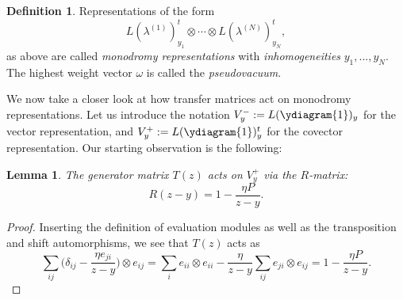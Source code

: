 \documentclass[11pt]{report}
\newtheorem{lemma}[theorem]{Lemma}
\theoremstyle{definition}
\newtheorem{definition}[theorem]{Definition}
\theoremstyle{remark}
\theoremstyle{remark}
\begin{document}
\begin{definition}
Representations of the form
\begin{equation*}
L(\lambda^{(1)})_{y_1}^t \otimes \cdots \otimes L(\lambda^{(N)})_{y_N}^t,
\end{equation*}
as above are called \emph{monodromy representations} with \emph{inhomogeneities} $y_1,...,y_N$. The highest weight vector $\omega$ is called the \emph{pseudovacuum}.
\end{definition}

We now take a closer look at how transfer matrices act on monodromy representations. Let us introduce the notation $V_y^- := L(\ydiagram{1})_y$ for the vector representation, and $V_y^+ := L(\ydiagram{1})_y^t$ for the covector representation. Our starting observation is the following:

\begin{lemma}
The generator matrix $T(z)$ acts on $V_y^+$ via the $R$-matrix:
\begin{equation*}
R(z-y) = 1 - \frac{\eta P}{z-y}.
\end{equation*}
\end{lemma}

\begin{proof}
Inserting the definition of evaluation modules as well as the transposition and shift automorphisms, we see that $T(z)$ acts as
\begin{equation*}
\sum_{ij} \bigg( \delta_{ij} - \frac{\eta e_{ji}}{z-y} \bigg) \otimes e_{ij}
= \sum_{i} e_{ii} \otimes e_{ii} - \frac{\eta}{z-y} \sum_{ij} e_{ji} \otimes e_{ij} = 1 - \frac{\eta P}{z-y}.
\end{equation*}
\end{proof}
\end{document}

